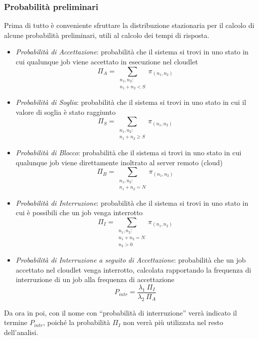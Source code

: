 \subsubsection{Probabilità preliminari}
Prima di tutto è conveniente sfruttare la distribuzione stazionaria per il
calcolo di alcune probabilità preliminari, utili al calcolo dei tempi di
risposta.
\begin{itemize}
\item \emph{Probabilità di Accettazione}: probabilità che il sistema si trovi in
uno stato in cui qualunque job viene accettato in esecuzione nel cloudlet
\begin{equation}
\Pi_A = \sum_{\substack{n_1,n_2:\\n_1 + n_2 < S}} \pi_{(n_1,n_2)}
\end{equation}
\item \emph{Probabilità di Soglia}: probabilità che il sistema si trovi in uno
stato in cui il valore di soglia è stato raggiunto
\begin{equation}
\Pi_S = \sum_{\substack{n_1,n_2:\\ n_1 + n_2 \geq S}} \pi_{(n_1,n_2)}
\end{equation}
\item \emph{Probabilità di Blocco}: probabilità che il sistema si trovi in uno
stato in cui qualunque job viene direttamente inoltrato al server remoto (cloud)
\begin{equation}
\Pi_B = \sum_{\substack{n_1,n_2:\\n_1 + n_2 = N}} \pi_{(n_1,n_2)}
\end{equation}
\item \emph{Probabilità di Interruzione}: probabilità che il sistema si trovi in
uno stato in cui è possibili che un job venga interrotto
\begin{equation}
\Pi_I = \sum_{\substack{n_1,n_2:\\n_1 + n_2 = N\\n_2 > 0}} \pi_{(n_1,n_2)}
\end{equation}
\item \emph{Probabilità di Interruzione a seguito di Accettazione}: probabilità
che un job accettato nel cloudlet venga interrotto, calcolata rapportando la
frequenza di interruzione di un job alla frequenza di accettazione
\begin{equation}
P_{intr} = \frac{\lambda_1 \ \Pi_I}{\lambda_2 \ \Pi_A}
\end{equation}
\end{itemize}
Da ora in poi, con il nome con ``probabilità di
interruzione'' verrà indicato il termine $P_{intr}$, poiché la probabilità
$\Pi_I$ non verrà più utilizzata nel resto dell'analisi.
%
%
